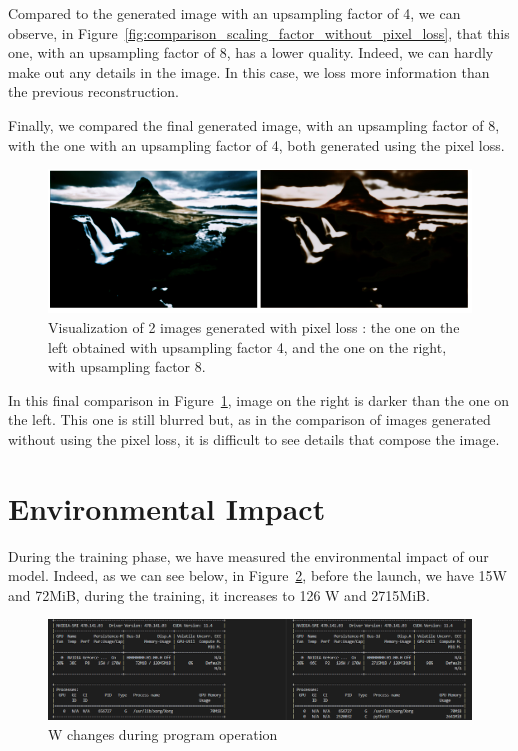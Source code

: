 \documentclass{article}
\begin{document}
{    Compared to the generated image with an upsampling factor of 4, we can observe, in Figure~\ref{fig:comparison_scaling_factor_without_pixel_loss}, that this one, with an upsampling factor of 8, has a lower quality. Indeed, we can hardly make out any details in the image. In this case, we loss more information than the previous reconstruction.
    
    Finally, we compared the final generated image, with an upsampling factor of 8, with the one with an upsampling factor of 4, both generated using the pixel loss.

     \begin{figure}[H]
        \centering
        \includegraphics[height=0.2\textheight]{images/comparison_scaling_factor_with_pixel_loss.png}
        \caption{Visualization of 2 images generated with pixel loss : the one on the left obtained with upsampling factor 4, and the one on the right, with upsampling factor 8.}
    \label{fig:comparison_scaling_factor_with_pixel_loss}
    \end{figure}

    In this final comparison in Figure~\ref{fig:comparison_scaling_factor_with_pixel_loss}, image on the right is darker than the one on the left. This one is still blurred but, as in the comparison of images generated without using the pixel loss, it is difficult to see details that compose the image.
}

{
    \section{Environmental Impact}
    \label{sec:env-impact}

    During the training phase, we have measured the environmental impact of our model. Indeed, as we can see below, in Figure~\ref{fig:impact}, before the launch, we have 15W and 72MiB, during the training, it increases to  126 W and 2715MiB. 
    
    \begin{figure}[H]
        \centering
        \includegraphics[scale=0.5]{images/impact.png}
        \caption{W changes during program operation}
    \label{fig:impact}
    \end{figure}
}
\end{document}
